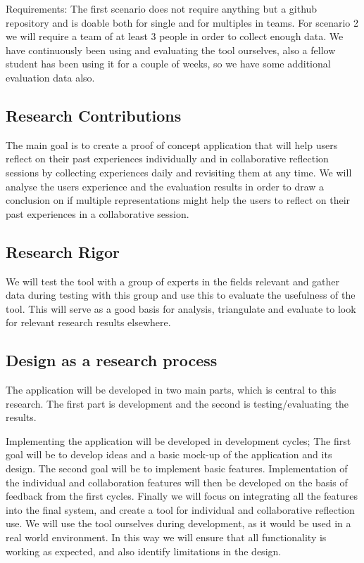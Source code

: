 Requirements: 
The first scenario does not require anything but a github repository and is doable both for single and for multiples in teams.
For scenario 2 we will require a team of at least 3 people in order to collect enough data. 
We have continuously been using and evaluating the tool ourselves, also a fellow student has been using it for a couple of weeks, so we have some additional evaluation
data also.

\subsection{Research Contributions}
The main goal is to create a proof of concept application that will help users reflect on their past experiences individually and in collaborative reflection sessions by collecting experiences daily and revisiting them at any time. We will analyse the users experience and the evaluation results  in order to draw a conclusion on if multiple representations might help the users to reflect on their past experiences in a collaborative session.

\subsection{Research Rigor}
We will test the tool with a group of experts in the fields relevant and gather data during testing with this group and use this to evaluate the usefulness of the tool. This will serve as a good basis for analysis, triangulate and evaluate to look for relevant research results elsewhere.

\subsection{Design as a research process}
The application will be developed in two main parts, which is central to this research. The first part is development and the second is testing/evaluating the results.

Implementing the application will be developed in development cycles; The first goal will be to develop ideas and a basic mock-up of the application and its design. The second goal will be to implement basic features. Implementation of the individual and collaboration features will then be developed on the basis of feedback from the first cycles. Finally we will focus on integrating all the features into the final system, and create a tool for individual and collaborative reflection use. We will use the tool ourselves during development, as it would be used in a real world environment. In this way we will ensure that all functionality is working as expected, and also identify limitations in the design. 


